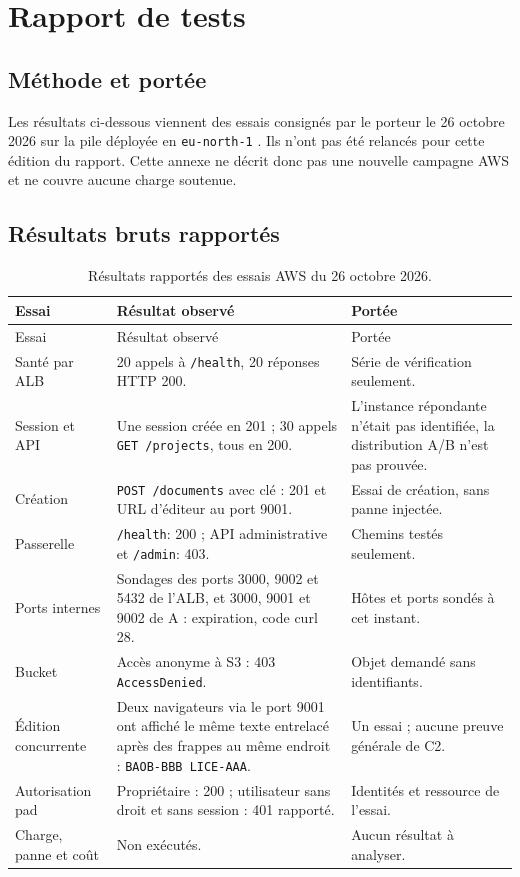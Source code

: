 \chapter{Rapport de tests}
\label{ann:rapport-tests}

\section{Méthode et portée}

Les résultats ci-dessous viennent des essais consignés par le porteur le 26 octobre 2026 sur la pile déployée en \texttt{eu-north-1} \cite{aws-test-records}. Ils n'ont pas été relancés pour cette édition du rapport. Cette annexe ne décrit donc pas une nouvelle campagne AWS et ne couvre aucune charge soutenue.

\section{Résultats bruts rapportés}

\begin{longtable}{@{}L{39mm}L{61mm}L{48mm}@{}}
\caption{Résultats rapportés des essais AWS du 26 octobre 2026.}\label{tab:tests-aws}\\
\toprule Essai & Résultat observé & Portée \\
\midrule\endfirsthead
\toprule Essai & Résultat observé & Portée \\
\midrule\endhead
Santé par ALB & 20 appels à \texttt{/health}, 20 réponses HTTP 200. & Série de vérification seulement. \\
Session et API & Une session créée en 201 ; 30 appels \texttt{GET /projects}, tous en 200. & L'instance répondante n'était pas identifiée, la distribution A/B n'est pas prouvée. \\
Création & \texttt{POST /documents} avec clé : 201 et URL d'éditeur au port 9001. & Essai de création, sans panne injectée. \\
Passerelle & \texttt{/health}: 200 ; API administrative et \texttt{/admin}: 403. & Chemins testés seulement. \\
Ports internes & Sondages des ports 3000, 9002 et 5432 de l'ALB, et 3000, 9001 et 9002 de A : expiration, code curl 28. & Hôtes et ports sondés à cet instant. \\
Bucket & Accès anonyme à S3 : 403 \texttt{AccessDenied}. & Objet demandé sans identifiants. \\
Édition concurrente & Deux navigateurs via le port 9001 ont affiché le même texte entrelacé après des frappes au même endroit : \texttt{BAOB-BBB LICE-AAA}. & Un essai ; aucune preuve générale de C2. \\
Autorisation pad & Propriétaire : 200 ; utilisateur sans droit et sans session : 401 rapporté. & Identités et ressource de l'essai. \\
Charge, panne et coût & Non exécutés. & Aucun résultat à analyser. \\
\bottomrule
\end{longtable}

